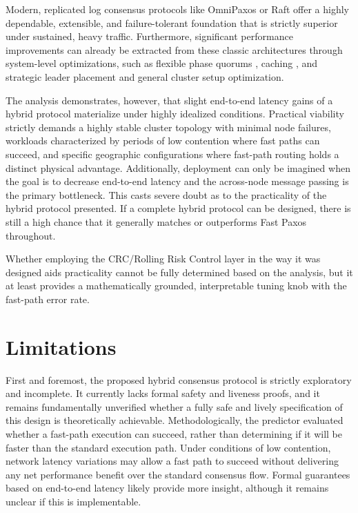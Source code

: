 Modern, replicated log consensus protocols like OmniPaxos \cite{Ng-OmniPaxos-2023} or Raft \cite{Ongaro-Raft-2014} offer a highly dependable, extensible, and failure-tolerant foundation that is strictly superior under sustained, heavy traffic. Furthermore, significant performance improvements can already be extracted from these classic architectures through system-level optimizations, such as flexible phase quorums \cite{Howard-FlexiblePaxos-2016}, caching \cite{Ng-UniCache-2023}, and strategic leader placement and general cluster setup optimization.

The analysis demonstrates, however, that slight end-to-end latency gains of a hybrid protocol materialize under highly idealized conditions. Practical viability strictly demands a highly stable cluster topology with minimal node failures, workloads characterized by periods of low contention where fast paths can succeed, and specific geographic configurations where fast-path routing holds a distinct physical advantage. Additionally, deployment can only be imagined when the goal is to decrease end-to-end latency and the across-node message passing is the primary bottleneck. This casts severe doubt as to the practicality of the hybrid protocol presented. If a complete hybrid protocol can be designed, there is still a high chance that it generally matches or outperforms Fast Paxos throughout.

Whether employing the \gls{CRC}/Rolling Risk Control layer in the way it was designed aids practicality cannot be fully determined based on the analysis, but it at least provides a mathematically grounded, interpretable tuning knob with the fast-path error rate.

\section{Limitations}
\label{sec:limitations}

First and foremost, the proposed hybrid consensus protocol is strictly exploratory and incomplete. It currently lacks formal safety and liveness proofs, and it remains fundamentally unverified whether a fully safe and lively specification of this design is theoretically achievable. Methodologically, the predictor evaluated whether a fast-path execution can succeed, rather than determining if it will be faster than the standard execution path. Under conditions of low contention, network latency variations may allow a fast path to succeed without delivering any net performance benefit over the standard consensus flow. Formal guarantees based on end-to-end latency likely provide more insight, although it remains unclear if this is implementable.

